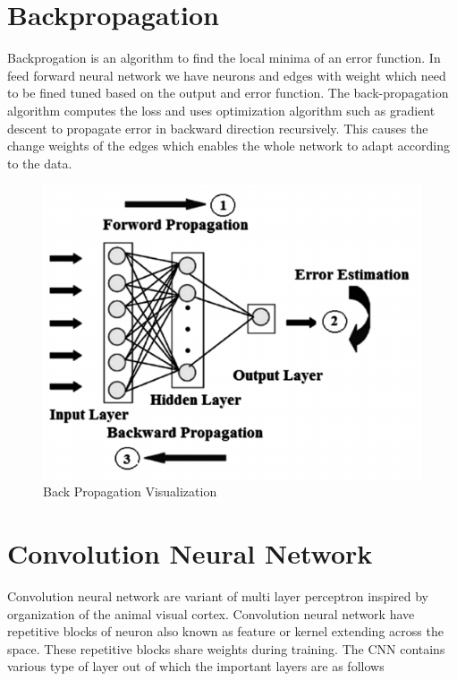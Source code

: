 \section{Backpropagation}
 Backprogation\cite{rumelhart1988learning} is an algorithm to find the local minima of an error function. In feed forward neural network we have neurons and edges with weight which need to be fined tuned based on the output and error function.  The back-propagation algorithm computes the loss and uses optimization algorithm such as gradient descent to propagate error in backward direction recursively. This  causes the change weights of the edges which enables the whole network to adapt according to the data.  
\begin{figure}[H]
  \centering
    \includegraphics[scale=.4, angle=0]{Files/BackPropagation.png}
    \caption[Back Propagation Visualization]{Back Propagation Visualization}
    \label{fig:FFNN}
\end{figure}

\section{Convolution Neural Network}

Convolution neural network are variant of multi layer perceptron inspired by organization of the animal visual cortex. Convolution neural network have repetitive blocks of neuron also known as feature or kernel extending across the space. These repetitive blocks share weights during training. The CNN contains various type of layer out of which the important layers are  as follows

